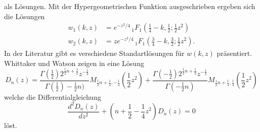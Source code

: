 als Lösungen.
Mit der Hypergeometrischen Funktion ausgeschrieben ergeben sich die Lösungen
\begin{align}
	\label{parzyl:eq:solution_dgl}
    w_1(k,z) &= e^{-z^2/4} \,
    {}_{1} F_{1}
    (
        {\textstyle \frac{1}{4}} 
         - k, {\textstyle \frac{1}{2}} ; {\textstyle \frac{1}{2}}z^2) \\
    w_2(k,z) & = z e^{-z^2/4} \,
         {}_{1} F_{1}
         ({\textstyle \frac{3}{4}} 
              - k, {\textstyle \frac{3}{2}} ; {\textstyle \frac{1}{2}}z^2).
\end{align}
In der Literatur gibt es verschiedene Standartlösungen für $w(k,z)$ präsentiert.
Whittaker und Watson zeigen in \cite{parzyl:whittaker} eine Lösung
\begin{equation}
    D_n(z) = \frac{
            \Gamma \left( {\textstyle \frac{1}{2}}\right) 2^{\frac{1}{2}n + \frac{1}{2}} z^{-\frac{1}{2}}
        }{
            \Gamma \left( {\textstyle \frac{1}{2}} \right) - {\textstyle \frac{1}{2}} n)
        }
        M_{\frac{1}{2} n + \frac{1}{4}, - \frac{1}{4}} \left(\frac{1}{2}z^2\right)
        +
        \frac{
            \Gamma\left(-{\textstyle \frac{1}{2}}\right) 2^{\frac{1}{2}n + \frac{1}{2}} z^{-\frac{1}{2}}
        }{
            \Gamma\left(- {\textstyle \frac{1}{2}} n\right)
        }
        M_{\frac{1}{2} n + \frac{1}{4}, \frac{1}{4}} \left(\frac{1}{2}z^2\right)
\end{equation}
welche die Differentialgleichung
\begin{equation}
    \frac{d^2D_n(z)}{dz^2} + \left(n + \frac{1}{2} - \frac{1}{4} z^2\right)D_n(z) = 0
\end{equation}
löst.

